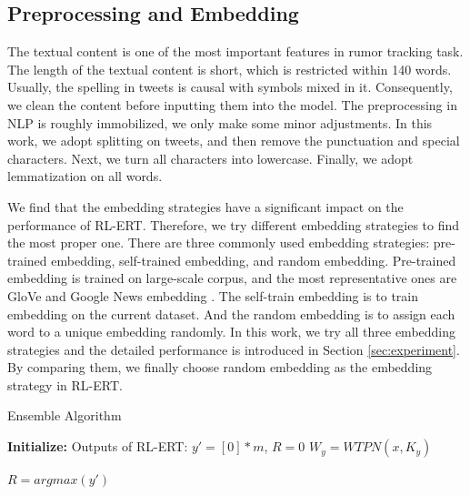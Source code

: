 \documentclass[review]{elsarticle}
\begin{document}
\subsection{Preprocessing and Embedding}
\label{sec:process_embedding}
The textual content is one of the most important features in rumor tracking task. The length of the textual content is short, which is restricted within 140 words. Usually, the spelling in tweets is causal with symbols mixed in it. Consequently, we clean the content before inputting them into the model. The preprocessing in NLP is roughly immobilized, we only make some minor adjustments. In this work, we adopt splitting on tweets, and then remove the punctuation and special characters. Next, we turn all characters into lowercase. Finally, we adopt lemmatization on all words.

We find that the embedding strategies have a significant impact on the performance of RL-ERT. Therefore, we try different embedding strategies to find the most proper one. There are three commonly used embedding strategies: pre-trained embedding, self-trained embedding, and random embedding. Pre-trained embedding is trained on large-scale corpus, and the most representative ones are GloVe \cite{DBLP:conf/emnlp/PenningtonSM14} and Google News embedding \cite{googlenews}. The self-train embedding is to train embedding on the current dataset. And the random embedding is to assign each word to a unique embedding randomly. In this work, we try all three embedding strategies and the detailed performance is introduced in Section \ref{sec:experiment}. By comparing them, we finally choose random embedding as the embedding strategy in RL-ERT.

\begin{algorithm}[tbp]
	\caption{Ensemble Algorithm}
	\label{algorithm:RL-BRT}
	\LinesNumbered %
	\textbf{Initialize:} Outputs of RL-ERT: $y' = [0]*m$, $R = 0$ \;
	$W_y =  WTPN(x, K_y)$ \;
	
	$R = argmax(y')$
\end{algorithm}
\end{document}
